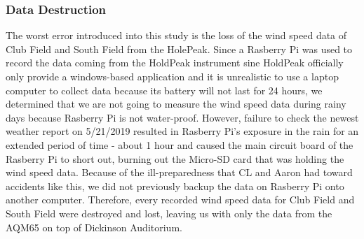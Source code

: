 \documentclass[review]{elsarticle}
\begin{document}
\subsubsection{Data Destruction}
\label{sec:analysis:erroranalysis:datadestruction}
The worst error introduced into this study is the loss of the wind speed data of Club Field and South Field from the HolePeak. Since a Rasberry Pi was used to record the data coming from the HoldPeak 
instrument sine HoldPeak officially only provide a windows-based application and it is unrealistic to use a laptop computer to collect data because its battery will not last for 24 hours, we determined 
that we are not going to measure the wind speed data during rainy days because Rasberry Pi is not water-proof. However, failure to check the newest weather report on 5/21/2019 resulted in Rasberry Pi's 
exposure in the rain for an extended period of time - about 1 hour and caused the main circuit board of the Rasberry Pi to short out, burning out the Micro-SD card that was holding the wind speed data. 
Because of the ill-preparedness that CL and Aaron had toward accidents like this, we did not previously backup the data on Rasberry Pi onto another computer. Therefore, every recorded wind speed data for 
Club Field and South Field were destroyed and lost, leaving us with only the data from the AQM65 on top of Dickinson Auditorium.


\clearpage
    
\end{document}
